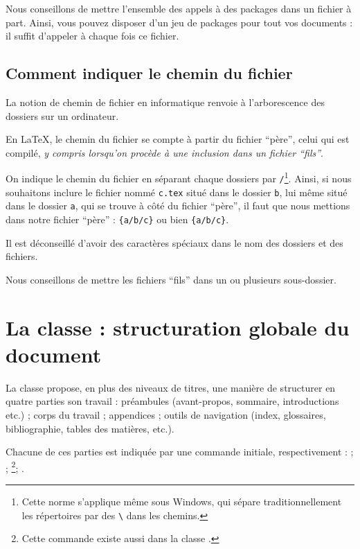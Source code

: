 Nous conseillons de mettre l'ensemble des appels à des packages dans un fichier à part. Ainsi, vous pouvez disposer d'un jeu de packages pour tout vos documents : il suffit d'appeler à chaque fois ce fichier.


\subsection{Comment indiquer le chemin du fichier}\label{chemin}

La notion de chemin de fichier en informatique renvoie à l'arborescence des dossiers sur un ordinateur.

En \LaTeX{}, le chemin du fichier se compte à partir du fichier \enquote{père}, celui qui est compilé, \emph{y compris lorsqu'on procède à une inclusion dans un fichier \enquote{fils}}.

On indique le chemin du fichier en séparant chaque dossiers par \verb|/|\footnote{Cette norme s'applique même sous Windows, qui sépare traditionnellement les répertoires par des \texttt{\textbackslash} dans les chemins.}. Ainsi, si nous souhaitons inclure le fichier nommé \verb|c.tex| situé dans le dossier \verb|b|, lui même situé dans le dossier \verb|a|, qui se trouve à côté du fichier \enquote{père}, il faut que nous mettions dans notre fichier \enquote{père} : \verb|{a/b/c}|
ou bien
\verb|{a/b/c}|.

\begin{attention}

Il est déconseillé d'avoir des caractères spéciaux dans le nom des dossiers et des fichiers.
\end{attention}

Nous conseillons de mettre les fichiers \enquote{fils} dans un ou plusieurs sous-dossier.

\section{La classe  : structuration globale du document}\label{sectionbook}

La classe  propose, en plus des niveaux de titres, une manière de structurer en quatre parties son travail : préambules (avant-propos, sommaire, introductions etc.) ; corps du travail ; appendices ; outils de navigation (index, glossaires, bibliographie, tables des matières,  etc.). 

Chacune de ces parties est indiquée par une commande initiale, respectivement :  ;  ; \footnote{Cette commande existe aussi dans la classe .}; .

